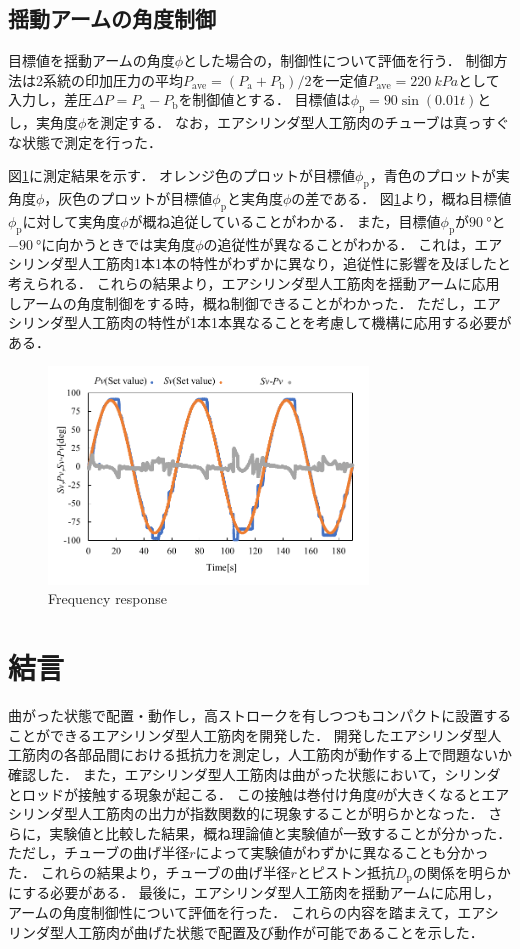 \subsection{揺動アームの角度制御}
目標値を揺動アームの角度$\phi$とした場合の，制御性について評価を行う．
制御方法は2系統の印加圧力の平均$P_\mathrm{ave}=(P_\mathrm{a} + P_\mathrm{b})/2$を一定値$P_\mathrm{ave}=\SI{220}{kPa}$として入力し，差圧$\Delta P = P_\mathrm{a} - P_\mathrm{b}$を制御値とする．
目標値は$\phi_\mathrm{p} = 90 \sin(0.01t)$とし，実角度$\phi$を測定する．
なお，エアシリンダ型人工筋肉のチューブは真っすぐな状態で測定を行った．
\par
図\ref{Frequency response}に測定結果を示す．
オレンジ色のプロットが目標値$\phi_\mathrm{p}$，青色のプロットが実角度$\phi$，灰色のプロットが目標値$\phi_\mathrm{p}$と実角度$\phi$の差である．
図\ref{Frequency response}より，概ね目標値$\phi_\mathrm{p}$に対して実角度$\phi$が概ね追従していることがわかる．
また，目標値$\phi_\mathrm{p}$が$\SI{90}{\degree}$と$\SI{-90}{\degree}$に向かうときでは実角度$\phi$の追従性が異なることがわかる．
これは，エアシリンダ型人工筋肉1本1本の特性がわずかに異なり，追従性に影響を及ぼしたと考えられる．
これらの結果より，エアシリンダ型人工筋肉を揺動アームに応用しアームの角度制御をする時，概ね制御できることがわかった．
ただし，エアシリンダ型人工筋肉の特性が1本1本異なることを考慮して機構に応用する必要がある．
\begin{figure}[t]
  \centering
  \includegraphics[width=85mm]{_pdf/result_frequency_response.pdf}
  \caption{Frequency response}
  \label{Frequency response}
\end{figure}

\section{結言}%
曲がった状態で配置・動作し，高ストロークを有しつつもコンパクトに設置することができるエアシリンダ型人工筋肉を開発した．
開発したエアシリンダ型人工筋肉の各部品間における抵抗力を測定し，人工筋肉が動作する上で問題ないか確認した．
また，エアシリンダ型人工筋肉は曲がった状態において，シリンダとロッドが接触する現象が起こる．
この接触は巻付け角度$\theta$が大きくなるとエアシリンダ型人工筋肉の出力が指数関数的に現象することが明らかとなった．
さらに，実験値と比較した結果，概ね理論値と実験値が一致することが分かった．
ただし，チューブの曲げ半径$r$によって実験値がわずかに異なることも分かった．
これらの結果より，チューブの曲げ半径$r$とピストン抵抗$D_\mathrm{p}$の関係を明らかにする必要がある．
最後に，エアシリンダ型人工筋肉を揺動アームに応用し，アームの角度制御性について評価を行った．
これらの内容を踏まえて，エアシリンダ型人工筋肉が曲げた状態で配置及び動作が可能であることを示した．